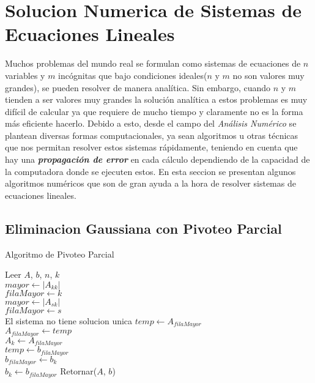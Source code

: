 \documentclass[12pt]{article}
\begin{document}
        \section{Solucion Numerica de Sistemas de Ecuaciones Lineales}
        Muchos problemas del mundo real se formulan como sistemas de ecuaciones de $n$ variables y $m$ incógnitas que bajo condiciones ideales($n$ y $m$ no son valores muy grandes), se pueden resolver de manera analítica. Sin embargo, cuando $n$ y $m$ tienden a ser valores muy grandes la solución analítica a estos problemas es muy difícil de calcular ya que requiere de mucho tiempo y claramente no es la forma más eficiente hacerlo. Debido a esto, desde el campo del \textit{Análisis Numérico} se plantean diversas formas computacionales, ya sean algoritmos u otras técnicas que nos permitan resolver estos sistemas rápidamente, teniendo en cuenta que hay una \textit{\textbf{propagación de error}} en cada cálculo dependiendo de la capacidad de la computadora donde se ejecuten estos.
        En  esta seccion se presentan algunos algoritmos numéricos que son de gran ayuda a la hora de resolver sistemas de ecuaciones lineales.
        
        \subsection{Eliminacion Gaussiana con Pivoteo Parcial}
        
        \begin{algorithm}[H]
            \caption{Algoritmo de Pivoteo Parcial}
            Leer $A$, $b$, $n$, $k$ \\
            $mayor \leftarrow |A_{kk}|$\\
            $filaMayor \leftarrow k$\\
            {
                {
                    $mayor \leftarrow |A_{sk}| $ \\
                    $filaMayor \leftarrow s$\\
                }
            }
            {
                El sistema no tiene solucion unica
            } 
            {
                $temp \leftarrow A_{filaMayor}$\\
                $A_{filaMayor} \leftarrow temp$\\
                $A_{k} \leftarrow A_{filaMayor}$\\
                $temp \leftarrow b_{filaMayor}$\\
                $b_{filaMayor} \leftarrow b_{k}$\\
                $b_{k} \leftarrow b_{filaMayor}$
            }
            Retornar($A$, $b$)
        \end{algorithm}
\end{document}
